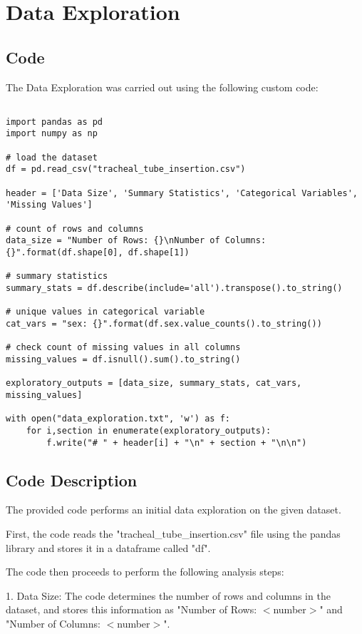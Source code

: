 \documentclass[11pt]{article}
\begin{document}
\section{Data Exploration}
\subsection{{Code}}
The Data Exploration was carried out using the following custom code:

\begin{verbatim}

import pandas as pd
import numpy as np 

# load the dataset
df = pd.read_csv("tracheal_tube_insertion.csv")

header = ['Data Size', 'Summary Statistics', 'Categorical Variables', 'Missing Values']

# count of rows and columns
data_size = "Number of Rows: {}\nNumber of Columns: {}".format(df.shape[0], df.shape[1])

# summary statistics
summary_stats = df.describe(include='all').transpose().to_string()

# unique values in categorical variable
cat_vars = "sex: {}".format(df.sex.value_counts().to_string())

# check count of missing values in all columns
missing_values = df.isnull().sum().to_string()

exploratory_outputs = [data_size, summary_stats, cat_vars, missing_values]

with open("data_exploration.txt", 'w') as f:
    for i,section in enumerate(exploratory_outputs):
        f.write("# " + header[i] + "\n" + section + "\n\n")

\end{verbatim}

\subsection{Code Description}

The provided code performs an initial data exploration on the given dataset. 

First, the code reads the "tracheal\_tube\_insertion.csv" file using the pandas library and stores it in a dataframe called "df". 

The code then proceeds to perform the following analysis steps:

1. Data Size: The code determines the number of rows and columns in the dataset, and stores this information as "Number of Rows: $<$number$>$" and "Number of Columns: $<$number$>$".
\end{document}
